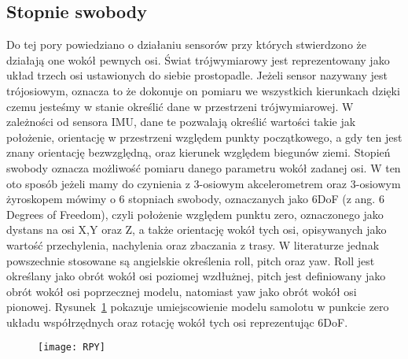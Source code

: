 		\subsection{Stopnie swobody}
		\label{subsec:swobody}	
		Do tej pory powiedziano o działaniu sensorów przy których stwierdzono że działają one wokół pewnych osi. Świat trójwymiarowy jest reprezentowany jako układ trzech osi ustawionych do siebie prostopadle. Jeżeli sensor nazywany jest trójosiowym, oznacza to że dokonuje on pomiaru we wszystkich kierunkach dzięki czemu jesteśmy w stanie określić dane w przestrzeni trójwymiarowej. W zależności od sensora IMU, dane te pozwalają określić wartości takie jak położenie, orientację w przestrzeni względem punkty początkowego, a gdy ten jest znany orientację bezwzględną, oraz kierunek względem biegunów ziemi. Stopień swobody oznacza możliwość pomiaru danego parametru wokół zadanej osi. W ten oto sposób jeżeli mamy do czynienia z 3-osiowym akcelerometrem oraz 3-osiowym żyroskopem mówimy o 6 stopniach swobody, oznaczanych jako 6DoF (z ang. 6 Degrees of Freedom), czyli położenie względem punktu zero, oznaczonego jako dystans na osi X,Y oraz Z, a także orientację wokół tych osi, opisywanych jako wartość przechylenia, nachylenia oraz zbaczania z trasy. W literaturze jednak powszechnie stosowane są angielskie określenia roll, pitch oraz yaw. Roll jest określany jako obrót wokół osi poziomej wzdłużnej, pitch jest definiowany jako obrót wokół osi poprzecznej modelu, natomiast yaw jako obrót wokół osi pionowej. Rysunek~\ref{fig:rpy} pokazuje umiejscowienie modelu samolotu w punkcie zero układu współrzędnych oraz rotację wokół tych osi reprezentując 6DoF. 
\begin{figure}[h]
\centering
\texttt{[image: RPY]}
\label{fig:rpy}
\end{figure}	
